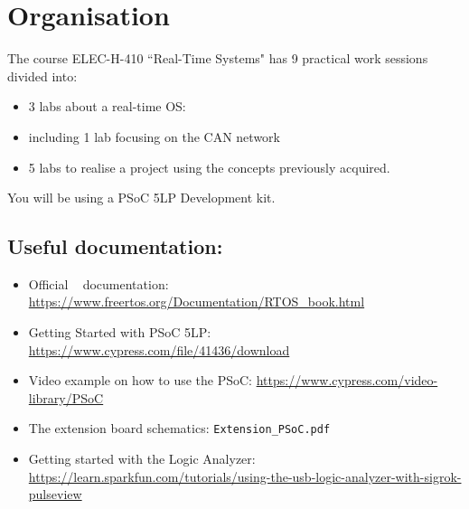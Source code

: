 \section*{Organisation}
The course ELEC-H-410 ``Real-Time Systems" has 9 practical work sessions divided into:
\begin{itemize}
    \item 3 labs about a real-time OS: \rtos~
    \item including 1 lab focusing on the CAN network
    \item 5 labs to realise a project using the concepts previously acquired.
\end{itemize}
You will be using a PSoC 5LP Development kit.
 
\subsection*{Useful documentation:}
\begin{itemize}
    \item Official \rtos~ documentation: \url{https://www.freertos.org/Documentation/RTOS_book.html}
    \item Getting Started with PSoC 5LP: \url{https://www.cypress.com/file/41436/download}
    \item Video example on how to use the PSoC: \url{https://www.cypress.com/video-library/PSoC}
    \item The extension board schematics: \texttt{Extension\_PSoC.pdf}
		\item Getting started with the Logic Analyzer: \url{https://learn.sparkfun.com/tutorials/using-the-usb-logic-analyzer-with-sigrok-pulseview}
\end{itemize}